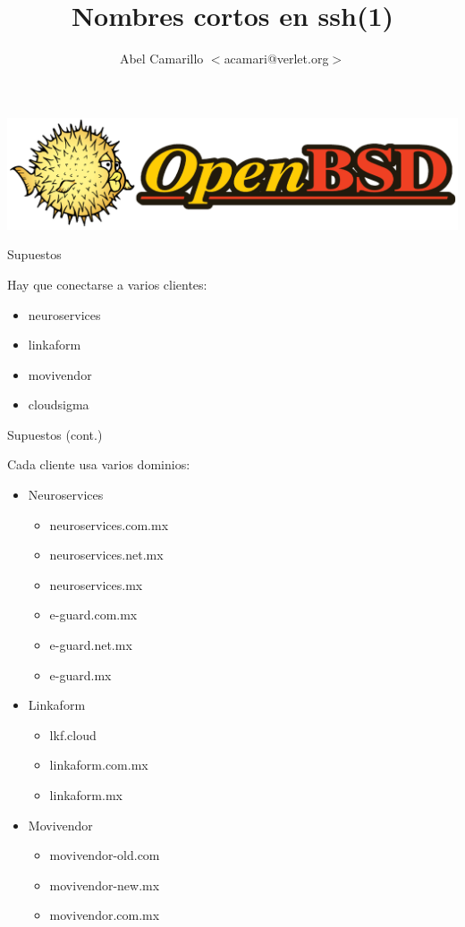 \documentclass[11pt,spanish]{article}
\title{Nombres cortos en ssh(1)}
\author{Abel Camarillo $<$acamari@verlet.org$>$}
\newcommand{\rowsp}[1][1em]{\vspace{#1}}
\newcommand{\hone}[1]{{\rowsp[0.3em]\noindent\Large #1 \rowsp[0.3em]}}
\newcommand{\myitm}[1]{\begin{itemize}#1\end{itemize}}
\begin{document}
\maketitle
\thispagestyle{empty}

\begin{center}
\includegraphics[height=0.3\textheight]{img/puflogh}
\end{center}


\newpage %
\hone{Supuestos}

Hay que conectarse a varios clientes:
\myitm{
	\item neuroservices
	\item linkaform
	\item movivendor
	\item cloudsigma
}

\newpage %

\hone{Supuestos (cont.)}

Cada cliente usa varios dominios:
\begin{multicols}{2}
\myitm{
	\item Neuroservices
	\myitm{
		\item neuroservices.com.mx
		\item neuroservices.net.mx
		\item neuroservices.mx
		\item e-guard.com.mx
		\item e-guard.net.mx
		\item e-guard.mx
	}

	\item Linkaform
	\myitm{
		\item lkf.cloud
		\item linkaform.com.mx
		\item linkaform.mx
	}
	\columnbreak

	\item Movivendor
	\myitm{
		\item movivendor-old.com
		\item movivendor-new.mx
		\item movivendor.com.mx
	}

}
\end{multicols}
\end{document}
